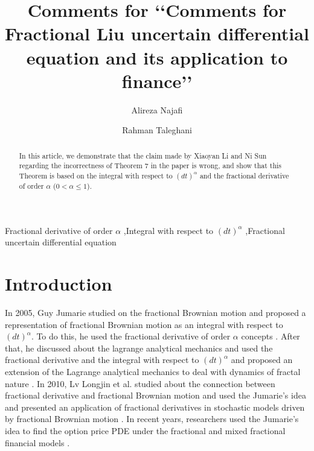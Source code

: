 \documentclass[a4paper,fleqn]{cas-dc}
\title [mode = title]{Comments for ‘‘Comments for Fractional Liu uncertain differential equation and its
	application to finance’’}
\author[1]{Alireza Najafi}
\affiliation[1]{organization={Department of Applied Mathematics, Faculty of Mathematical Sciences, University of Guilan},
            city={Rasht},
            postcode={41938-1914}, 
            state={Guilan},
            country={Iran}}
\author[1]{Rahman Taleghani}
\begin{document}
\begin{abstract}
In this article, we  demonstrate that the claim made by Xiaoyan Li and Ni Sun \cite{bib 1} regarding the incorrectness of Theorem 7 in the paper \cite{bib 2}  is wrong, and  show that this  Theorem is  based on the integral with respect to $(dt)^{\alpha}$  and the fractional derivative of order $\alpha$ ($ 0 < \alpha \leq 1$). 
\end{abstract}
\begin{keywords}
 Fractional derivative of order $\alpha$ \sep Integral with respect to $(dt)^{\alpha}$ \sep Fractional uncertain differential equation
\end{keywords}
\maketitle


	
	
	

	
	
	
	\section{Introduction}
	In 2005,  Guy Jumarie studied on the fractional Brownian motion and proposed a  representation of fractional Brownian motion as an integral with respect to $ (dt)^{\alpha}$. To do this, he used the fractional derivative of order $\alpha$ concepts \cite{bib 3}. After that, he  discussed about the  lagrange analytical mechanics and used the fractional derivative and the  integral with respect to $ (dt)^{\alpha}$ and   proposed an extension of the Lagrange analytical mechanics to deal with dynamics of fractal nature \cite{bib 4}. In 2010, Lv Longjin et al. studied about the  connection between fractional derivative and fractional Brownian motion  and used the  Jumarie's idea and presented an application of fractional derivatives in stochastic models driven by fractional Brownian motion \cite{bib 5}. In recent years, researchers used  the Jumarie's idea to find the option price PDE under the fractional  and mixed fractional financial models \cite{bib 6, bib 7, bib 8,bib 9}.
	
\end{document}
